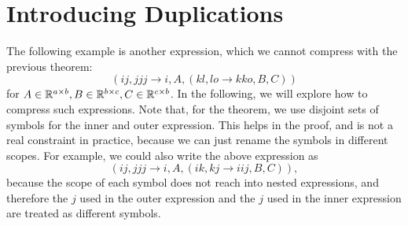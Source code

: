 \section{Introducing Duplications}

The following example is another expression, which we cannot compress with the previous theorem:
$$(ij, jjj \rightarrow i, A, (kl, lo \rightarrow kko, B, C))$$
for $A \in \mathbb{R}^{a \times b}, B \in \mathbb{R}^{b \times c}, C \in \mathbb{R}^{c \times b}$.
In the following, we will explore how to compress such expressions.
Note that, for the theorem, we use disjoint sets of symbols for the inner and outer expression.
This helps in the proof, and is not a real constraint in practice,
because we can just rename the symbols in different scopes.
For example, we could also write the above expression as
$$(ij, jjj \rightarrow i, A, (ik, kj \rightarrow iij, B, C)),$$
because the scope of each symbol does not reach into nested expressions,
and therefore the $j$ used in the outer expression and the $j$ used in the inner expression are treated as different symbols.

